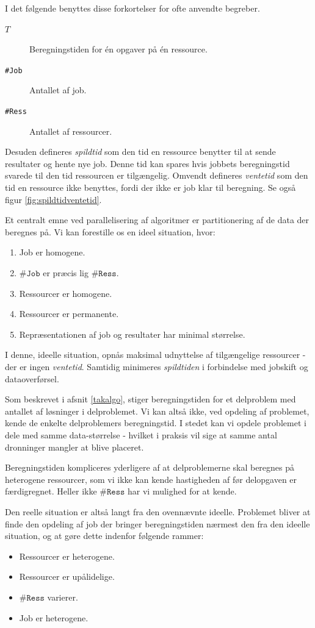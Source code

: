 \documentclass[draft,a4paper,11pt]{article}
\begin{document}
I det følgende benyttes disse forkortelser for ofte anvendte begreber.
\begin{description}
	\item[$T$] Beregningstiden for én opgaver på én ressource.  
	\item[\texttt{\#Job}] Antallet af job.
	\item[\texttt{\#Ress}] Antallet af ressourcer.  
\end{description}

Desuden defineres \emph{spildtid} som den tid en ressource benytter til at sende resultater og hente nye job. Denne tid kan spares hvis jobbets beregningstid svarede til den tid ressourcen er tilgængelig. Omvendt defineres \emph{ventetid} som den tid en ressource ikke benyttes, fordi der ikke er job klar til beregning. Se også figur \ref{fig:spildtidventetid}.

Et centralt emne ved parallelisering af algoritmer er partitionering af de data der beregnes på. Vi kan forestille os en ideel situation, hvor:
\begin{enumerate}
	\item Job er homogene. \label{beregningstid}
	\item $\texttt{\#Job}$ er præcis lig $\texttt{\#Ress}$.\label{antal}
	\item Ressourcer er homogene. 
	\item Ressourcer er permanente.
	\item Repræsentationen af job og resultater har minimal størrelse.\label{jobbeskrivelse}
\end{enumerate}

I denne, ideelle situation, opnås maksimal udnyttelse af tilgængelige ressourcer - der er ingen \emph{ventetid}. Samtidig minimeres \emph{spildtiden} i forbindelse med jobskift og dataoverførsel.
 
Som beskrevet i afsnit \ref{takalgo}, stiger beregningstiden for et delproblem med antallet af løsninger i delproblemet. Vi kan altså ikke, ved opdeling af problemet, kende de enkelte delproblemers beregningstid. I stedet kan vi opdele problemet i dele med samme data-størrelse - hvilket i praksis vil sige at samme antal dronninger mangler at blive placeret. 

Beregningstiden kompliceres yderligere af at delproblemerne skal beregnes på heterogene ressourcer, som vi ikke kan kende hastigheden af før delopgaven er færdigregnet. Heller ikke $\texttt{\#Ress}$ har vi mulighed for at kende. 

Den reelle situation er altså langt fra den ovennævnte ideelle. Problemet bliver at finde den opdeling af job der bringer beregningstiden nærmest den fra den ideelle situation, og at gøre dette indenfor følgende rammer:
\begin{itemize}
	\item Ressourcer er heterogene.
	\item Ressourcer er upålidelige.
	\item $\texttt{\#Ress}$ varierer.
	\item Job er heterogene.
\end{itemize}
\end{document}
